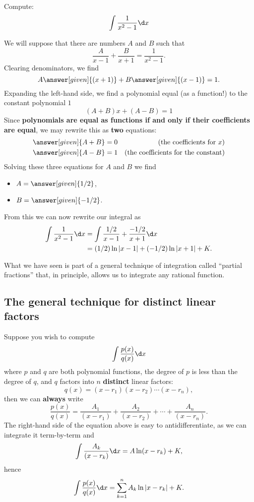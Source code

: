 \documentclass{ximera}
\begin{document}
\begin{example}
  Compute:
  \[
  \int \frac{1}{x^2-1} \d x
  \]
  \begin{explanation}
    We will suppose that there are numbers $A$ and $B$ such that
    \[
    \frac{A}{x-1} + \frac{B}{x+1} = \frac{1}{x^2-1}.
    \]
    Clearing denominators, we find
    \[
    A\answer[given]{(x+1)} + B\answer[given]{(x-1)} = 1.
    \]
    Expanding the left-hand side, we find a polynomial equal (as a
    function!) to the constant polynomial $1$
    \[
    (A+ B)x + (A-B) = 1
    \]
    Since \textbf{polynomials are equal as functions if and only if
      their coefficients are equal}, we may rewrite this as
    \textbf{two} equations:
    \begin{align*}
      \answer[given]{A+B} &= 0 &\text{(the coefficients for $x$)}\\
      \answer[given]{A-B} &= 1 &\text{(the coefficients for the constant)}
    \end{align*}
    Solving these three equations for $A$ and $B$ we find
    \begin{itemize}
    \item $A = \answer[given]{1/2}$,
    \item $B = \answer[given]{-1/2}$.
    \end{itemize} 
    From this we can now rewrite our integral as
    \begin{align*}
      \int \frac{1}{x^2-1} \d x &=  \int \frac{1/2}{x-1} + \frac{-1/2}{x+1} \d x\\
      &= (1/2)\ln|x-1| + (-1/2)\ln|x+1|+ K.
    \end{align*}
  \end{explanation}
\end{example}

What we have seen is part of a general technique of integration called
``partial fractions'' that, in principle,
allows us to integrate any rational function.

\subsection{The general technique for distinct linear factors}

Suppose you wish to compute
\[
\int \frac{p(x)}{q(x)} \d x
\]
where $p$ and $q$ are both polynomial functions, the degree of $p$ is
less than the degree of $q$, and $q$ factors into $n$
\textbf{distinct} linear factors:
\[
q(x) = (x-r_1) (x-r_2) \cdots (x-r_n),
\]
then we can \textbf{always} write
\[
\frac{p(x)}{q(x)}  = \frac{A_1}{(x-r_1)} + \frac{A_2}{(x-r_2)} + \cdots + \frac{A_n}{(x-r_n)}. 
\]
The right-hand side of the equation above is easy to antidifferentiate,
as we can integrate it term-by-term and
\[
\int \frac{A_k}{(x-r_k)} \d x = A \ln(x-r_k) + K,
\]
hence
\[
\int \frac{p(x)}{q(x)} \d x = \sum_{k=1}^n A_k \ln|x-r_k| +K.
\]
\end{document}

